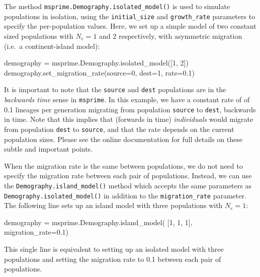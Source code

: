 \documentclass[graybox]{svmult}
\newcommand{\msprime}[0]{\texttt{msprime}}
\begin{document}
\label{isolated-model}
The method \texttt{msprime.Demography.isolated\_model()} is used to
simulate populations in isolation,
using the  \texttt{initial\_size} and
\texttt{growth\_rate} parameters to specify the per-population
values.
Here, we set up a simple model of two constant sized populations 
with $N_e=1$ and $2$ respectively,
with asymmetric
migration (i.e.\ a continent-island model):
\begin{pythoncode}
    demography = msprime.Demography.isolated_model([1, 2])
    demography.set_migration_rate(source=0, dest=1, rate=0.1)
\end{pythoncode}
It is important to note that the \texttt{source} and 
\texttt{dest} populations are in the \emph{backwards time} 
sense in \msprime. 
In this example, we have a constant rate of 
of 0.1 lineages per generation migrating from population
\texttt{source} to \texttt{dest}, backwards in time.
Note that this implies that (forwards in time) \emph{individuals}
would migrate from population \texttt{dest} to \texttt{source},
and that the rate depends on the current population sizes.
Please see the online documentation 
for full details on these subtle and important points.

\label{island-model}
When the migration rate is the same between populations, we do not
need to specify the migration rate between each pair of populations. Instead,
we can use the \texttt{Demography.island\_model()} method which accepts
the same parameters as \texttt{Demography.isolated\_model()} in
addition to the \texttt{migration\_rate} parameter. The following line sets up an
island model with three populations with $N_e = 1$:
\begin{pythoncode}
    demography = msprime.Demography.island_model(
        [1, 1, 1], migration_rate=0.1)
\end{pythoncode}
This single line is equivalent to setting up an isolated model with three populations
and setting the migration rate to 0.1 between each pair of populations.


\end{document}
